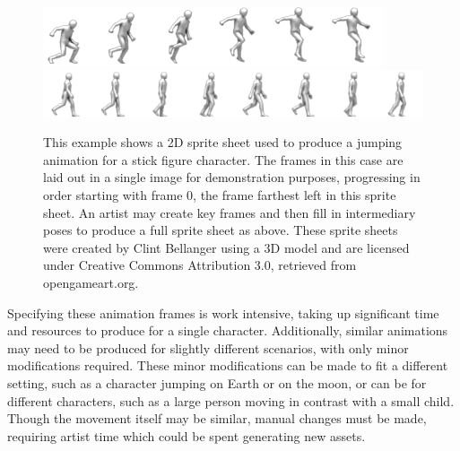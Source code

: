 \begin{figure}[htp]
    \centering
    \includegraphics[width=\textwidth]{images/sprite_example/platformer_sprites_jump.png}
    \includegraphics[width=\textwidth]{images/sprite_example/platformer_sprites_walk.png}
    \caption[Example of a 2D Sprite Animation]{This example shows a 2D sprite sheet used to produce a jumping animation for a stick figure character.  The frames in this case are laid out in a single image for demonstration purposes, progressing in order starting with frame 0, the frame farthest left in this sprite sheet.  An artist may create key frames and then fill in intermediary poses to produce a full sprite sheet as above.  These sprite sheets were created by Clint Bellanger using a 3D model and are licensed under Creative Commons Attribution 3.0, retrieved from opengameart.org.}
    \label{fig:sprite_sheet}
\end{figure}


Specifying these animation frames is work intensive, taking up significant time and resources to produce for a single character.  Additionally, similar animations may need to be produced for slightly different scenarios, with only minor modifications required.  These minor modifications can be made to fit a different setting, such as a character jumping on Earth or on the moon, or can be for different characters, such as a large person moving in contrast with a small child.  Though the movement itself may be similar, manual changes must be made, requiring artist time which could be spent generating new assets.  

